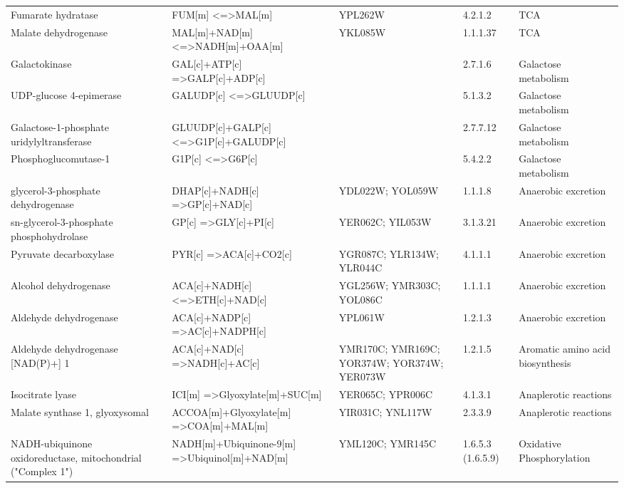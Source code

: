 {\begin{landscape}
\begin{longtable}{p{.20\linewidth} | p{.25\linewidth} | p{.19\linewidth} | p{.05\linewidth} | p{.10\linewidth}}
Fumarate hydratase & FUM{[}m{]} \textless{}=\textgreater MAL{[}m{]}  & YPL262W & 4.2.1.2  & TCA  \\
Malate dehydrogenase & MAL{[}m{]}+NAD{[}m{]} \textless{}=\textgreater NADH{[}m{]}+OAA{[}m{]}  & YKL085W & 1.1.1.37 & TCA  \\
Galactokinase  & GAL{[}c{]}+ATP{[}c{]} =\textgreater GALP{[}c{]}+ADP{[}c{]} & & 2.7.1.6  & Galactose metabolism  \\
UDP-glucose 4-epimerase  & GALUDP{[}c{]} \textless{}=\textgreater GLUUDP{[}c{]}  & & 5.1.3.2  & Galactose metabolism  \\
Galactose-1-phosphate uridylyltransferase & GLUUDP{[}c{]}+GALP{[}c{]} \textless{}=\textgreater G1P{[}c{]}+GALUDP{[}c{]} & & 2.7.7.12 & Galactose metabolism  \\
Phosphoglucomutase-1 & G1P{[}c{]} \textless{}=\textgreater G6P{[}c{]}  & & 5.4.2.2  & Galactose metabolism  \\
glycerol-3-phosphate dehydrogenase  & DHAP{[}c{]}+NADH{[}c{]} =\textgreater GP{[}c{]}+NAD{[}c{]} & YDL022W; YOL059W & 1.1.1.8  & Anaerobic excretion \\
sn-glycerol-3-phosphate phosphohydrolase  & GP{[}c{]} =\textgreater GLY{[}c{]}+PI{[}c{]}  & YER062C; YIL053W & 3.1.3.21 & Anaerobic excretion \\
Pyruvate decarboxylase & PYR{[}c{]} =\textgreater ACA{[}c{]}+CO2{[}c{]}  & YGR087C; YLR134W; YLR044C  & 4.1.1.1  & Anaerobic excretion \\
Alcohol dehydrogenase  & ACA{[}c{]}+NADH{[}c{]} \textless{}=\textgreater ETH{[}c{]}+NAD{[}c{]}  & YGL256W; YMR303C; YOL086C  & 1.1.1.1  & Anaerobic excretion \\
Aldehyde dehydrogenase & ACA{[}c{]}+NADP{[}c{]} =\textgreater AC{[}c{]}+NADPH{[}c{]}  & YPL061W & 1.2.1.3  & Anaerobic excretion \\
Aldehyde dehydrogenase {[}NAD(P)+{]} 1  & ACA{[}c{]}+NAD{[}c{]} =\textgreater NADH{[}c{]}+AC{[}c{]}  & YMR170C; YMR169C; YOR374W; YOR374W; YER073W & 1.2.1.5  & Aromatic amino acid biosynthesis \\
Isocitrate lyase & ICI{[}m{]} =\textgreater Glyoxylate{[}m{]}+SUC{[}m{]} & YER065C; YPR006C & 4.1.3.1  & Anaplerotic reactions \\
Malate synthase 1, glyoxysomal  & ACCOA{[}m{]}+Glyoxylate{[}m{]} =\textgreater COA{[}m{]}+MAL{[}m{]} & YIR031C; YNL117W & 2.3.3.9  & Anaplerotic reactions \\
NADH-ubiquinone oxidoreductase, mitochondrial ("Complex 1")  & NADH{[}m{]}+Ubiquinone-9{[}m{]} =\textgreater Ubiquinol{[}m{]}+NAD{[}m{]}  & YML120C; YMR145C & 1.6.5.3 (1.6.5.9)  & Oxidative Phosphorylation \\

\end{longtable}
\end{landscape}}
